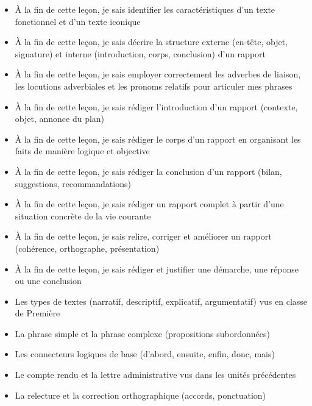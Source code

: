 \documentclass[11pt]{article}
\begin{document}
\begin{objectifs}
\begin{itemize}
\item À la fin de cette leçon, je sais identifier les caractéristiques d'un texte fonctionnel et d'un texte iconique
\item À la fin de cette leçon, je sais décrire la structure externe (en-tête, objet, signature) et interne (introduction, corps, conclusion) d'un rapport
\item À la fin de cette leçon, je sais employer correctement les adverbes de liaison, les locutions adverbiales et les pronoms relatifs pour articuler mes phrases
\item À la fin de cette leçon, je sais rédiger l'introduction d'un rapport (contexte, objet, annonce du plan)
\item À la fin de cette leçon, je sais rédiger le corps d'un rapport en organisant les faits de manière logique et objective
\item À la fin de cette leçon, je sais rédiger la conclusion d'un rapport (bilan, suggestions, recommandations)
\item À la fin de cette leçon, je sais rédiger un rapport complet à partir d'une situation concrète de la vie courante
\item À la fin de cette leçon, je sais relire, corriger et améliorer un rapport (cohérence, orthographe, présentation)
\item À la fin de cette leçon, je sais rédiger et justifier une démarche, une réponse ou une conclusion
\end{itemize}
\end{objectifs}

\begin{prerequis}
\begin{itemize}
\item Les types de textes (narratif, descriptif, explicatif, argumentatif) vus en classe de Première
\item La phrase simple et la phrase complexe (propositions subordonnées)
\item Les connecteurs logiques de base (d'abord, ensuite, enfin, donc, mais)
\item Le compte rendu et la lettre administrative vus dans les unités précédentes
\item La relecture et la correction orthographique (accords, ponctuation)
\end{itemize}
\end{prerequis}
\end{document}
